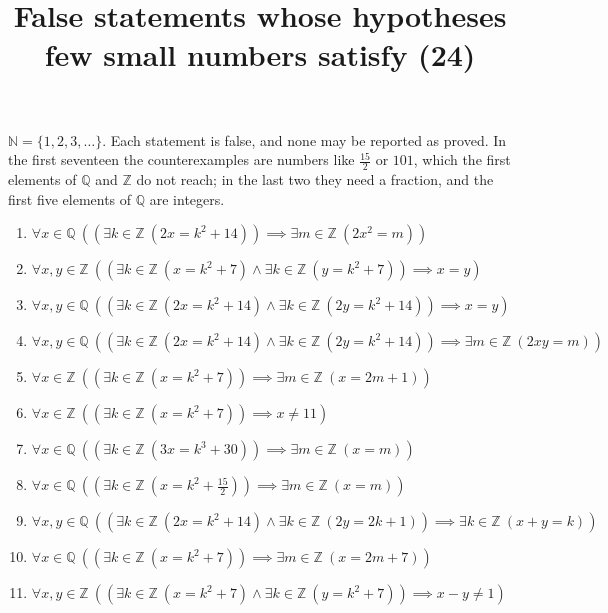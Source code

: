 \documentclass[11pt,a4paper]{article}
\title{False statements whose hypotheses few small numbers satisfy (24)}
\author{}
\date{}
\begin{document}
\maketitle
$\mathbb{N} = \{1, 2, 3, \ldots\}$. Each statement is false, and none may be reported as proved. In the first seventeen the counterexamples are numbers like $\frac{15}{2}$ or $101$, which the first elements of $\mathbb{Q}$ and $\mathbb{Z}$ do not reach; in the last two they need a fraction, and the first five elements of $\mathbb{Q}$ are integers.

\begin{enumerate}
\item $\displaystyle \forall x \in \mathbb{Q}\ ((\exists k \in \mathbb{Z}\ (2x = k^{2} + 14)) \implies \exists m \in \mathbb{Z}\ (2x^{2} = m))$
\item $\displaystyle \forall x, y \in \mathbb{Z}\ ((\exists k \in \mathbb{Z}\ (x = k^{2} + 7) \land \exists k \in \mathbb{Z}\ (y = k^{2} + 7)) \implies x = y)$
\item $\displaystyle \forall x, y \in \mathbb{Q}\ ((\exists k \in \mathbb{Z}\ (2x = k^{2} + 14) \land \exists k \in \mathbb{Z}\ (2y = k^{2} + 14)) \implies x = y)$
\item $\displaystyle \forall x, y \in \mathbb{Q}\ ((\exists k \in \mathbb{Z}\ (2x = k^{2} + 14) \land \exists k \in \mathbb{Z}\ (2y = k^{2} + 14)) \implies \exists m \in \mathbb{Z}\ (2xy = m))$
\item $\displaystyle \forall x \in \mathbb{Z}\ ((\exists k \in \mathbb{Z}\ (x = k^{2} + 7)) \implies \exists m \in \mathbb{Z}\ (x = 2m + 1))$
\item $\displaystyle \forall x \in \mathbb{Z}\ ((\exists k \in \mathbb{Z}\ (x = k^{2} + 7)) \implies x \neq 11)$
\item $\displaystyle \forall x \in \mathbb{Q}\ ((\exists k \in \mathbb{Z}\ (3x = k^{3} + 30)) \implies \exists m \in \mathbb{Z}\ (x = m))$
\item $\displaystyle \forall x \in \mathbb{Q}\ ((\exists k \in \mathbb{Z}\ (x = k^{2} + \frac{15}{2})) \implies \exists m \in \mathbb{Z}\ (x = m))$
\item $\displaystyle \forall x, y \in \mathbb{Q}\ ((\exists k \in \mathbb{Z}\ (2x = k^{2} + 14) \land \exists k \in \mathbb{Z}\ (2y = 2k + 1)) \implies \exists k \in \mathbb{Z}\ (x + y = k))$
\item $\displaystyle \forall x \in \mathbb{Q}\ ((\exists k \in \mathbb{Z}\ (x = k^{2} + 7)) \implies \exists m \in \mathbb{Z}\ (x = 2m + 7))$
\item $\displaystyle \forall x, y \in \mathbb{Z}\ ((\exists k \in \mathbb{Z}\ (x = k^{2} + 7) \land \exists k \in \mathbb{Z}\ (y = k^{2} + 7)) \implies x - y \neq 1)$

\end{enumerate}
\end{document}
